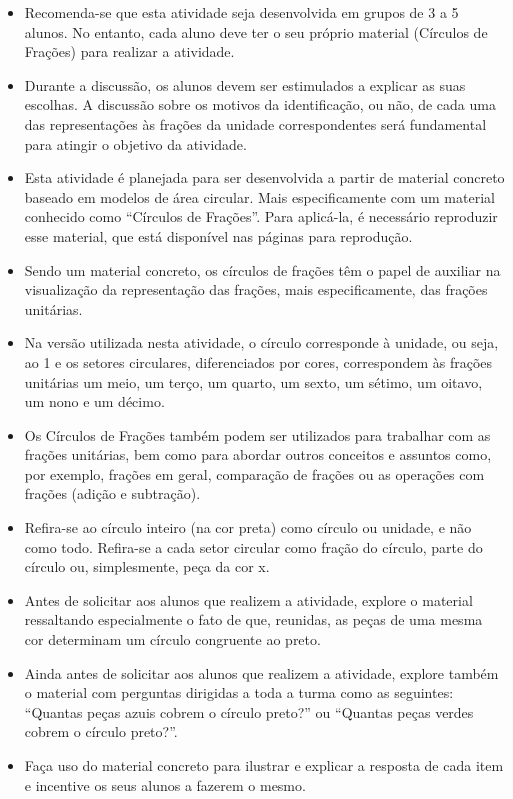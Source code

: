 \begin{multicols}{2}
\begin{itemize}
 \item Recomenda-se que esta atividade seja desenvolvida em grupos de 3 a 5 alunos. No entanto, cada aluno deve ter o seu próprio material (Círculos de Frações) para realizar a atividade.
 \item   Durante a discussão, os alunos devem ser estimulados a explicar as suas escolhas. A discussão sobre os motivos da identificação, ou não, de cada uma das representações às frações da unidade correspondentes será fundamental para atingir o objetivo da atividade.
 \item    Esta atividade é planejada para ser desenvolvida a partir de material concreto baseado em modelos de área circular. Mais especificamente com um material conhecido como ``Círculos de Frações''. Para aplicá-la, é necessário reproduzir esse material, que está disponível nas páginas para reprodução.
    \item Sendo um material concreto, os círculos de frações têm o papel de auxiliar na visualização da representação das frações, mais especificamente, das frações unitárias.
    \item Na versão utilizada nesta atividade, o círculo corresponde à unidade, ou seja, ao 1 e os setores circulares, diferenciados por cores, correspondem às frações unitárias um meio, um terço, um quarto, um sexto, um sétimo, um oitavo, um nono e um décimo.
    \item Os Círculos de Frações também podem ser utilizados para trabalhar com as frações unitárias, bem como para abordar outros conceitos e assuntos como, por exemplo, frações em geral, comparação de frações ou as operações com frações (adição e subtração).
    \item Refira-se ao círculo inteiro (na cor preta) como círculo ou unidade, e não como todo. Refira-se a cada setor circular como fração do círculo, parte do círculo ou, simplesmente, peça da cor x.
    \item Antes de solicitar aos alunos que realizem a atividade, explore o material ressaltando especialmente o fato de que, reunidas, as peças de uma mesma cor determinam um círculo congruente ao preto.
    \item Ainda antes de solicitar aos alunos que realizem a atividade, explore também o material com perguntas dirigidas a toda a turma como as seguintes: ``Quantas peças azuis cobrem o círculo preto?'' ou ``Quantas peças verdes cobrem o círculo preto?''.
    \item Faça uso do material concreto para ilustrar e explicar a resposta de cada item e incentive os seus alunos a fazerem o mesmo.

\end{itemize}
\end{multicols}

